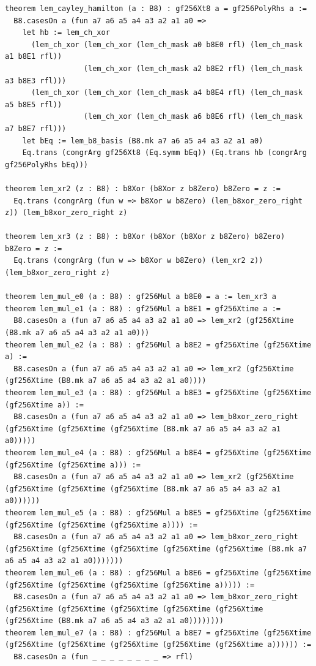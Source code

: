 \documentclass[10pt,twocolumn]{article}
\theoremstyle{spectralthm}
\begin{document}
\begin{lstlisting}[language=Lean4,caption={Standalone Pure Init.Prelude Term-Mode Lean 4 Expansion (thm30--thm37, v1.1.0, 0 sorry, 0 axioms).},label={lst:lean_v110}]
theorem lem_cayley_hamilton (a : B8) : gf256Xt8 a = gf256PolyRhs a :=
  B8.casesOn a (fun a7 a6 a5 a4 a3 a2 a1 a0 =>
    let hb := lem_ch_xor
      (lem_ch_xor (lem_ch_xor (lem_ch_mask a0 b8E0 rfl) (lem_ch_mask a1 b8E1 rfl))
                  (lem_ch_xor (lem_ch_mask a2 b8E2 rfl) (lem_ch_mask a3 b8E3 rfl)))
      (lem_ch_xor (lem_ch_xor (lem_ch_mask a4 b8E4 rfl) (lem_ch_mask a5 b8E5 rfl))
                  (lem_ch_xor (lem_ch_mask a6 b8E6 rfl) (lem_ch_mask a7 b8E7 rfl)))
    let bEq := lem_b8_basis (B8.mk a7 a6 a5 a4 a3 a2 a1 a0)
    Eq.trans (congrArg gf256Xt8 (Eq.symm bEq)) (Eq.trans hb (congrArg gf256PolyRhs bEq)))

theorem lem_xr2 (z : B8) : b8Xor (b8Xor z b8Zero) b8Zero = z :=
  Eq.trans (congrArg (fun w => b8Xor w b8Zero) (lem_b8xor_zero_right z)) (lem_b8xor_zero_right z)

theorem lem_xr3 (z : B8) : b8Xor (b8Xor (b8Xor z b8Zero) b8Zero) b8Zero = z :=
  Eq.trans (congrArg (fun w => b8Xor w b8Zero) (lem_xr2 z)) (lem_b8xor_zero_right z)

theorem lem_mul_e0 (a : B8) : gf256Mul a b8E0 = a := lem_xr3 a
theorem lem_mul_e1 (a : B8) : gf256Mul a b8E1 = gf256Xtime a :=
  B8.casesOn a (fun a7 a6 a5 a4 a3 a2 a1 a0 => lem_xr2 (gf256Xtime (B8.mk a7 a6 a5 a4 a3 a2 a1 a0)))
theorem lem_mul_e2 (a : B8) : gf256Mul a b8E2 = gf256Xtime (gf256Xtime a) :=
  B8.casesOn a (fun a7 a6 a5 a4 a3 a2 a1 a0 => lem_xr2 (gf256Xtime (gf256Xtime (B8.mk a7 a6 a5 a4 a3 a2 a1 a0))))
theorem lem_mul_e3 (a : B8) : gf256Mul a b8E3 = gf256Xtime (gf256Xtime (gf256Xtime a)) :=
  B8.casesOn a (fun a7 a6 a5 a4 a3 a2 a1 a0 => lem_b8xor_zero_right (gf256Xtime (gf256Xtime (gf256Xtime (B8.mk a7 a6 a5 a4 a3 a2 a1 a0)))))
theorem lem_mul_e4 (a : B8) : gf256Mul a b8E4 = gf256Xtime (gf256Xtime (gf256Xtime (gf256Xtime a))) :=
  B8.casesOn a (fun a7 a6 a5 a4 a3 a2 a1 a0 => lem_xr2 (gf256Xtime (gf256Xtime (gf256Xtime (gf256Xtime (B8.mk a7 a6 a5 a4 a3 a2 a1 a0))))))
theorem lem_mul_e5 (a : B8) : gf256Mul a b8E5 = gf256Xtime (gf256Xtime (gf256Xtime (gf256Xtime (gf256Xtime a)))) :=
  B8.casesOn a (fun a7 a6 a5 a4 a3 a2 a1 a0 => lem_b8xor_zero_right (gf256Xtime (gf256Xtime (gf256Xtime (gf256Xtime (gf256Xtime (B8.mk a7 a6 a5 a4 a3 a2 a1 a0)))))))
theorem lem_mul_e6 (a : B8) : gf256Mul a b8E6 = gf256Xtime (gf256Xtime (gf256Xtime (gf256Xtime (gf256Xtime (gf256Xtime a))))) :=
  B8.casesOn a (fun a7 a6 a5 a4 a3 a2 a1 a0 => lem_b8xor_zero_right (gf256Xtime (gf256Xtime (gf256Xtime (gf256Xtime (gf256Xtime (gf256Xtime (B8.mk a7 a6 a5 a4 a3 a2 a1 a0))))))))
theorem lem_mul_e7 (a : B8) : gf256Mul a b8E7 = gf256Xtime (gf256Xtime (gf256Xtime (gf256Xtime (gf256Xtime (gf256Xtime (gf256Xtime a)))))) :=
  B8.casesOn a (fun _ _ _ _ _ _ _ _ => rfl)


\end{lstlisting}
\end{document}
